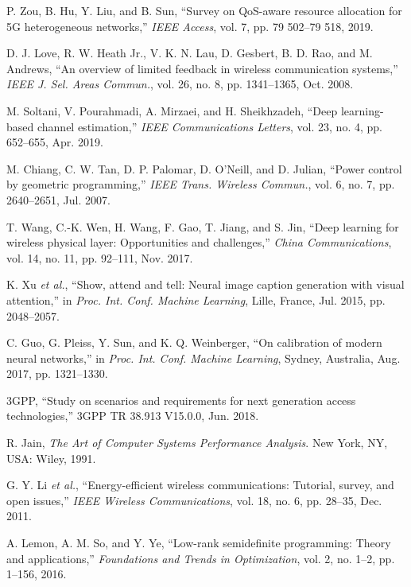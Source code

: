 \documentclass[conference]{IEEEtran}
\begin{document}
\begin{thebibliography}{20}
 P. Zou, B. Hu, Y. Liu, and B. Sun, ``Survey on QoS-aware resource allocation for 5G heterogeneous networks,'' \textit{IEEE Access}, vol. 7, pp. 79 502--79 518, 2019.

 D. J. Love, R. W. Heath Jr., V. K. N. Lau, D. Gesbert, B. D. Rao, and M. Andrews, ``An overview of limited feedback in wireless communication systems,'' \textit{IEEE J. Sel. Areas Commun.}, vol. 26, no. 8, pp. 1341--1365, Oct. 2008.

 M. Soltani, V. Pourahmadi, A. Mirzaei, and H. Sheikhzadeh, ``Deep learning-based channel estimation,'' \textit{IEEE Communications Letters}, vol. 23, no. 4, pp. 652--655, Apr. 2019.

 M. Chiang, C. W. Tan, D. P. Palomar, D. O'Neill, and D. Julian, ``Power control by geometric programming,'' \textit{IEEE Trans. Wireless Commun.}, vol. 6, no. 7, pp. 2640--2651, Jul. 2007.

 T. Wang, C.-K. Wen, H. Wang, F. Gao, T. Jiang, and S. Jin, ``Deep learning for wireless physical layer: Opportunities and challenges,'' \textit{China Communications}, vol. 14, no. 11, pp. 92--111, Nov. 2017.

 K. Xu \textit{et al.}, ``Show, attend and tell: Neural image caption generation with visual attention,'' in \textit{Proc. Int. Conf. Machine Learning}, Lille, France, Jul. 2015, pp. 2048--2057.

 C. Guo, G. Pleiss, Y. Sun, and K. Q. Weinberger, ``On calibration of modern neural networks,'' in \textit{Proc. Int. Conf. Machine Learning}, Sydney, Australia, Aug. 2017, pp. 1321--1330.

 3GPP, ``Study on scenarios and requirements for next generation access technologies,'' 3GPP TR 38.913 V15.0.0, Jun. 2018.

 R. Jain, \textit{The Art of Computer Systems Performance Analysis}. New York, NY, USA: Wiley, 1991.

 G. Y. Li \textit{et al.}, ``Energy-efficient wireless communications: Tutorial, survey, and open issues,'' \textit{IEEE Wireless Communications}, vol. 18, no. 6, pp. 28--35, Dec. 2011.

 A. Lemon, A. M. So, and Y. Ye, ``Low-rank semidefinite programming: Theory and applications,'' \textit{Foundations and Trends in Optimization}, vol. 2, no. 1--2, pp. 1--156, 2016.


\end{thebibliography}
\end{document}
